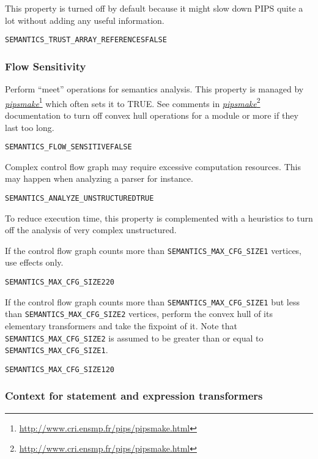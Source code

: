 \documentclass[a4paper]{report}
\newenvironment{PipsProp}{\begin{alltt}}{\end{alltt}}
\newcommand{\LINK}[2]{\href{#2}{#1}\footnote{\url{#2}}\xspace}
\newcommand{\PIPSMAKE}{\LINK{\emph{pipsmake}}{http://www.cri.ensmp.fr/pips/pipsmake.html}\xspace}
\begin{document}
This property is turned off by default because it might slow down PIPS
quite a lot without adding any useful information.

\begin{PipsProp}
SEMANTICS_TRUST_ARRAY_REFERENCES FALSE
\end{PipsProp}

\subsubsection{Flow Sensitivity}

Perform ``meet'' operations for semantics analysis. This property is
managed by \PIPSMAKE{} which often sets it to TRUE. See comments in
\PIPSMAKE{}
documentation to turn off convex hull operations for a module or more if
they last too long.

\begin{PipsProp}
SEMANTICS_FLOW_SENSITIVE FALSE
\end{PipsProp}

Complex control flow graph may require excessive computation
resources. This may happen when analyzing a parser for instance.

\begin{PipsProp}
SEMANTICS_ANALYZE_UNSTRUCTURED TRUE
\end{PipsProp}

To reduce execution time, this property is complemented with a heuristics
to turn off the analysis of very complex unstructured.

If the control flow graph counts more than \verb/SEMANTICS_MAX_CFG_SIZE1/
vertices, use effects only.

\begin{PipsProp}
SEMANTICS_MAX_CFG_SIZE2 20
\end{PipsProp}

If the control flow graph counts more than \verb/SEMANTICS_MAX_CFG_SIZE1/
but less than \verb/SEMANTICS_MAX_CFG_SIZE2/
vertices, perform the convex hull of its elementary transformers and take
the fixpoint of it. Note that \verb/SEMANTICS_MAX_CFG_SIZE2/ is assumed to
be greater than or equal to \verb/SEMANTICS_MAX_CFG_SIZE1/.

\begin{PipsProp}
SEMANTICS_MAX_CFG_SIZE1 20
\end{PipsProp}

\subsubsection{Context for statement and expression transformers}
\index{}
\end{document}
